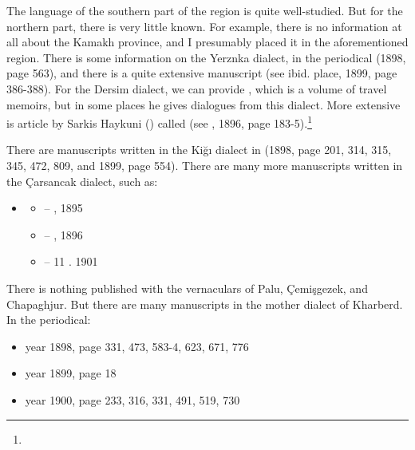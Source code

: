The language of the southern part of the region is quite well-studied. But for the northern part, there is very little known. For example, there is no information at all about the Kamakh province, and I presumably placed it in the aforementioned region. There is some information on the Yerznka dialect, in the periodical  (1898, page 563), and there is a quite extensive manuscript (see ibid. place, 1899, page 386-388). For the Dersim dialect, we can provide \citet{Antranik-1900-Dersim}, which is a volume of travel memoirs, but in some places he gives dialogues from this dialect. More extensive is article by Sarkis Haykuni () called  (see , 1896, page 183-5).\footnote{} 

{\litoverview}

There are manuscripts written in the Kiğı dialect in  (1898, page 201, 314, 315, 345, 472, 809, and 1899, page 554). There are many more manuscripts written in the Çarsancak dialect, such as:


\begin{itemize}
	\item {}
	\begin{itemize}
		\item – , 1895
		\item – , 1896
		\item – 11 . 1901
	\end{itemize}
\end{itemize}

\begin{adjarianpage}\label{page:168}\end{adjarianpage}%

There is nothing published with the vernaculars of Palu, Çemişgezek, and Chapaghjur. But there are many manuscripts in the mother dialect of Kharberd. In the  periodical: 
\begin{itemize}
	\item year 1898, page 331, 473, 583-4, 623, 671, 776
	\item year 1899, page 18
	\item year 1900, page 233, 316, 331, 491, 519, 730
	
\end{itemize}

